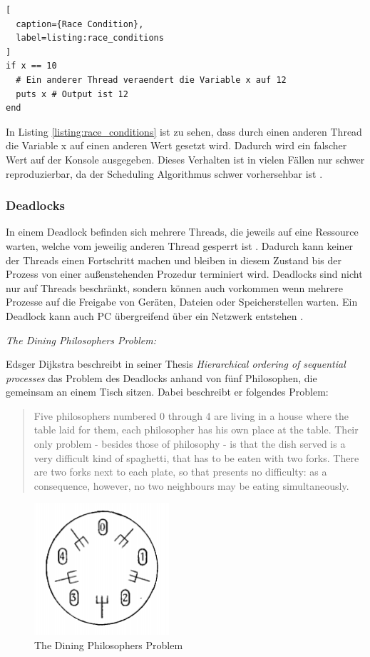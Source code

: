 \begin{lstlisting}[
  caption={Race Condition},
  label=listing:race_conditions
]
if x == 10
  # Ein anderer Thread veraendert die Variable x auf 12
  puts x # Output ist 12 
end
\end{lstlisting}

In Listing \ref{listing:race_conditions} ist zu sehen, dass durch einen anderen Thread die Variable x auf einen anderen Wert gesetzt wird. Dadurch wird ein falscher Wert auf der Konsole ausgegeben. Dieses Verhalten ist in vielen Fällen nur schwer reproduzierbar, da der Scheduling Algorithmus schwer vorhersehbar ist \cite[]{Net92}.

\subsubsection{Deadlocks}

In einem Deadlock befinden sich mehrere Threads, die jeweils auf eine Ressource warten, welche vom jeweilig anderen Thread gesperrt ist \cite[p. 1]{Jah04}. Dadurch kann keiner der Threads einen Fortschritt machen und bleiben in diesem Zustand bis der Prozess von einer außenstehenden Prozedur terminiert wird. Deadlocks sind nicht nur auf Threads beschränkt, sondern können auch vorkommen wenn mehrere Prozesse auf die Freigabe von Geräten, Dateien oder Speicherstellen warten. Ein Deadlock kann auch PC übergreifend über ein Netzwerk entstehen \cite[p. 177]{tan09}. 

\emph{The Dining Philosophers Problem:}

Edsger Dijkstra beschreibt in seiner Thesis \emph{Hierarchical ordering of sequential processes} das Problem des Deadlocks anhand von fünf Philosophen, die gemeinsam an einem Tisch sitzen. Dabei beschreibt er folgendes Problem:

\begin{quote}
  Five philosophers numbered 0 through 4 are living in a house where the table laid for them, each philosopher has his own place at the table. Their only problem - besides those of philosophy - is that the dish served is a very difficult kind of spaghetti, that has to be eaten with two forks. There are two forks next to each plate, so that presents no difficulty: as a consequence, however, no two neighbours may be eating simultaneously. \cite[p. 21]{dij71}
\end{quote} 

\begin{figure}[!htb]
  \centering
  \includegraphics[width=5cm]{images/philosophers.png}
  \caption{
    The Dining Philosophers Problem \cite[p. 21]{dij71} 
  }
  \label{figure:philosophers}
\end{figure}

